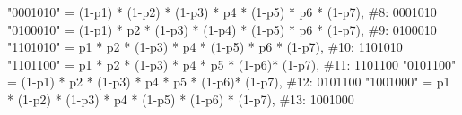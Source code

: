 \documentclass[
  letterpaper,
  DIV=11,
  numbers=noendperiod]{scrartcl}
\newenvironment{Shaded}{\begin{snugshade}}{\end{snugshade}}
\newcommand{\CommentTok}[1]{\textcolor[rgb]{0.37,0.37,0.37}{#1}}
\newcommand{\DecValTok}[1]{\textcolor[rgb]{0.68,0.00,0.00}{#1}}
\newcommand{\NormalTok}[1]{\textcolor[rgb]{0.00,0.23,0.31}{#1}}
\newcommand{\OtherTok}[1]{\textcolor[rgb]{0.00,0.23,0.31}{#1}}
\newcommand{\SpecialCharTok}[1]{\textcolor[rgb]{0.37,0.37,0.37}{#1}}
\newcommand{\StringTok}[1]{\textcolor[rgb]{0.13,0.47,0.30}{#1}}
\begin{document}
\begin{Shaded}
\begin{Highlighting}[]
          \StringTok{"0001010"} \OtherTok{=}\NormalTok{ (}\DecValTok{1}\SpecialCharTok{{-}}\NormalTok{p1) }\SpecialCharTok{*}\NormalTok{ (}\DecValTok{1}\SpecialCharTok{{-}}\NormalTok{p2) }\SpecialCharTok{*}\NormalTok{ (}\DecValTok{1}\SpecialCharTok{{-}}\NormalTok{p3) }\SpecialCharTok{*}\NormalTok{ p4 }\SpecialCharTok{*}\NormalTok{ (}\DecValTok{1}\SpecialCharTok{{-}}\NormalTok{p5) }\SpecialCharTok{*}\NormalTok{ p6 }\SpecialCharTok{*}\NormalTok{ (}\DecValTok{1}\SpecialCharTok{{-}}\NormalTok{p7),       }\CommentTok{\#8: 0001010}
          \StringTok{"0100010"} \OtherTok{=}\NormalTok{ (}\DecValTok{1}\SpecialCharTok{{-}}\NormalTok{p1) }\SpecialCharTok{*}\NormalTok{ p2 }\SpecialCharTok{*}\NormalTok{ (}\DecValTok{1}\SpecialCharTok{{-}}\NormalTok{p3) }\SpecialCharTok{*}\NormalTok{ (}\DecValTok{1}\SpecialCharTok{{-}}\NormalTok{p4) }\SpecialCharTok{*}\NormalTok{ (}\DecValTok{1}\SpecialCharTok{{-}}\NormalTok{p5) }\SpecialCharTok{*}\NormalTok{ p6 }\SpecialCharTok{*}\NormalTok{ (}\DecValTok{1}\SpecialCharTok{{-}}\NormalTok{p7),       }\CommentTok{\#9: 0100010}
          \StringTok{"1101010"} \OtherTok{=}\NormalTok{ p1 }\SpecialCharTok{*}\NormalTok{ p2 }\SpecialCharTok{*}\NormalTok{ (}\DecValTok{1}\SpecialCharTok{{-}}\NormalTok{p3) }\SpecialCharTok{*}\NormalTok{ p4 }\SpecialCharTok{*}\NormalTok{ (}\DecValTok{1}\SpecialCharTok{{-}}\NormalTok{p5) }\SpecialCharTok{*}\NormalTok{ p6 }\SpecialCharTok{*}\NormalTok{ (}\DecValTok{1}\SpecialCharTok{{-}}\NormalTok{p7),               }\CommentTok{\#10: 1101010}
          \StringTok{"1101100"} \OtherTok{=}\NormalTok{ p1 }\SpecialCharTok{*}\NormalTok{ p2 }\SpecialCharTok{*}\NormalTok{ (}\DecValTok{1}\SpecialCharTok{{-}}\NormalTok{p3) }\SpecialCharTok{*}\NormalTok{ p4 }\SpecialCharTok{*}\NormalTok{ p5 }\SpecialCharTok{*}\NormalTok{ (}\DecValTok{1}\SpecialCharTok{{-}}\NormalTok{p6)}\SpecialCharTok{*}\NormalTok{ (}\DecValTok{1}\SpecialCharTok{{-}}\NormalTok{p7),                }\CommentTok{\#11: 1101100}
          \StringTok{"0101100"} \OtherTok{=}\NormalTok{ (}\DecValTok{1}\SpecialCharTok{{-}}\NormalTok{p1) }\SpecialCharTok{*}\NormalTok{ p2 }\SpecialCharTok{*}\NormalTok{ (}\DecValTok{1}\SpecialCharTok{{-}}\NormalTok{p3) }\SpecialCharTok{*}\NormalTok{ p4 }\SpecialCharTok{*}\NormalTok{ p5 }\SpecialCharTok{*}\NormalTok{ (}\DecValTok{1}\SpecialCharTok{{-}}\NormalTok{p6)}\SpecialCharTok{*}\NormalTok{ (}\DecValTok{1}\SpecialCharTok{{-}}\NormalTok{p7),            }\CommentTok{\#12: 0101100}
          \StringTok{"1001000"} \OtherTok{=}\NormalTok{ p1 }\SpecialCharTok{*}\NormalTok{ (}\DecValTok{1}\SpecialCharTok{{-}}\NormalTok{p2) }\SpecialCharTok{*}\NormalTok{ (}\DecValTok{1}\SpecialCharTok{{-}}\NormalTok{p3) }\SpecialCharTok{*}\NormalTok{ p4 }\SpecialCharTok{*}\NormalTok{ (}\DecValTok{1}\SpecialCharTok{{-}}\NormalTok{p5) }\SpecialCharTok{*}\NormalTok{ (}\DecValTok{1}\SpecialCharTok{{-}}\NormalTok{p6) }\SpecialCharTok{*}\NormalTok{ (}\DecValTok{1}\SpecialCharTok{{-}}\NormalTok{p7),       }\CommentTok{\#13: 1001000}

\end{Highlighting}
\end{Shaded}
\end{document}
